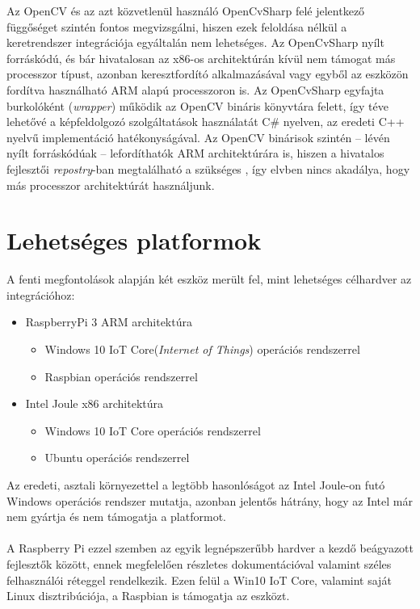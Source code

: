Az OpenCV és az azt közvetlenül használó OpenCvSharp felé jelentkező függőséget szintén fontos megvizsgálni, hiszen ezek feloldása nélkül a keretrendszer integrációja egyáltalán nem lehetséges. Az OpenCvSharp nyílt forráskódú, és bár hivatalosan az x86-os architektúrán kívül nem támogat más processzor típust, azonban keresztfordító alkalmazásával vagy egyből az eszközön fordítva használható ARM alapú processzoron is. Az OpenCvSharp egyfajta burkolóként (\emph{wrapper}) működik az OpenCV bináris könyvtára felett, így téve lehetővé a képfeldolgozó szolgáltatások használatát C\# nyelven, az eredeti C++ nyelvű implementáció hatékonyságával. Az OpenCV binárisok szintén -- lévén nyílt forráskódúak -- lefordíthatók ARM architektúrára is, hiszen a hivatalos fejlesztői \textit{repostry}-ban megtalálható a szükséges , így elvben nincs akadálya, hogy más processzor architektúrát használjunk. \\

\section{Lehetséges platformok}

A fenti megfontolások alapján két eszköz merült fel, mint lehetséges célhardver az integrációhoz:
\begin{itemize}
\item RaspberryPi 3 ARM architektúra
\begin{itemize}
\item Windows 10 IoT Core(\emph{Internet of Things}) operációs rendszerrel
\item Raspbian operációs rendszerrel
\end{itemize}
\item Intel Joule x86 architektúra
\begin{itemize}
\item Windows 10 IoT Core operációs rendszerrel
\item Ubuntu operációs rendszerrel 
\end{itemize}
\end{itemize}

Az eredeti, asztali környezettel a legtöbb hasonlóságot az Intel Joule-on futó Windows operációs rendszer mutatja, azonban jelentős hátrány, hogy az Intel már nem gyártja és nem támogatja a platformot.\\
\\
A Raspberry Pi ezzel szemben az egyik legnépszerűbb hardver a kezdő beágyazott fejlesztők között, ennek megfelelően részletes dokumentációval valamint széles felhasználói réteggel rendelkezik. Ezen felül a Win10 IoT Core, valamint saját Linux disztribúciója, a Raspbian is támogatja az eszközt.

